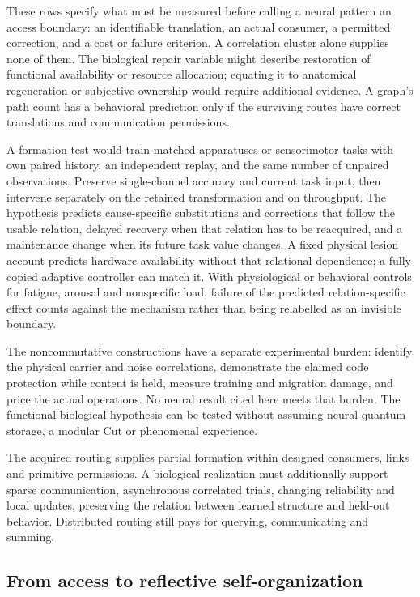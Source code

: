 \documentclass[11pt]{article}
\theoremstyle{definition}
\theoremstyle{remark}
\begin{document}
These rows specify what must be measured before calling a neural
pattern an access boundary: an identifiable translation, an
actual consumer, a permitted correction, and a cost or failure
criterion. A correlation cluster alone supplies none of them.
The biological repair variable might describe restoration of
functional availability or resource allocation; equating it to
anatomical regeneration or subjective ownership would require
additional evidence. A graph's path count has a behavioral
prediction only if the surviving routes have correct translations
and communication permissions.

A formation test would train matched apparatuses or sensorimotor
tasks with own paired history, an independent replay, and the same
number of unpaired observations. Preserve single-channel accuracy
and current task input, then intervene separately on the retained
transformation and on throughput. The hypothesis predicts
cause-specific substitutions and corrections that follow the usable
relation, delayed recovery when that relation has to be reacquired,
and a maintenance change when its future task value changes.
A fixed physical lesion account predicts hardware availability
without that relational dependence; a fully copied adaptive
controller can match it. With physiological or behavioral controls
for fatigue, arousal and nonspecific load, failure of the predicted
relation-specific effect counts against the mechanism rather than
being relabelled as an invisible boundary.

The noncommutative constructions have a separate experimental
burden: identify the physical carrier and noise correlations,
demonstrate the claimed code protection while content is held,
measure training and migration damage, and price the actual
operations. No neural result cited here meets that burden.
The functional biological hypothesis can be tested without
assuming neural quantum storage, a modular Cut or phenomenal
experience.

The acquired routing supplies partial formation within designed consumers, links and primitive permissions. A biological realization must additionally support sparse communication, asynchronous correlated trials, changing reliability and local updates, preserving the relation between learned structure and held-out behavior. Distributed routing still pays for querying, communicating and summing.

\subsection{From access to reflective self-organization}
\end{document}
